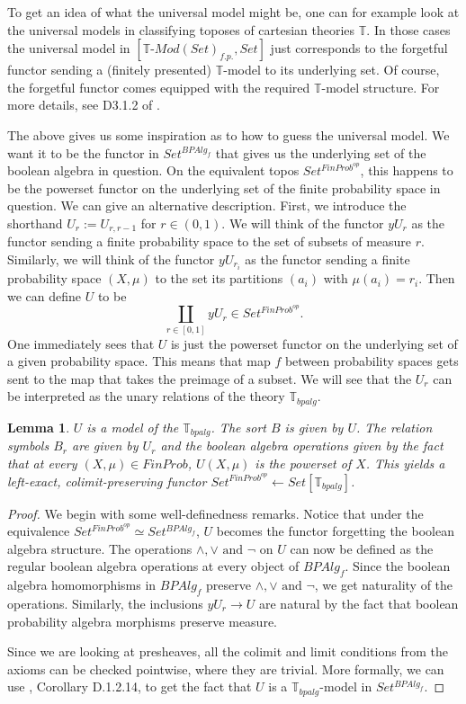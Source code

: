 \documentclass[a4paper]{amsproc}
\theoremstyle{plain}
\newtheorem{lemma}[theorem]{Lemma}
\theoremstyle{definition}
\theoremstyle{remark}
\numberwithin{equation}{section}
\begin{document}
To get an idea of what the universal model might be, one can for example look at the universal models in classifying toposes of cartesian theories $\mathbb{T}$. In those cases the universal model in $[\mathbb{T} \text{-} Mod(Set)_{f.p.}, Set]$ just corresponds to the forgetful functor sending a (finitely presented) $\mathbb{T}$-model to its underlying set. Of course, the forgetful functor comes equipped with the required $\mathbb{T}$-model structure. For more details, see D3.1.2 of \cite{elephant}.

The above gives us some inspiration as to how to guess the universal model. We want it to be the functor in $Set^{BPAlg_f}$ that gives us the underlying set of the boolean algebra in question. On the equivalent topos $Set^{FinProb^{op}}$, this happens to be the powerset functor on the underlying set of the finite probability space in question. We can give an alternative description. First, we introduce the shorthand $U_r := U_{r,r-1}$ for $r \in (0,1)$. We will think of the functor $y U_r$ as the functor sending a finite probability space to the set of subsets of measure $r$. Similarly, we will think of the functor $y U_{r_i}$ as the functor sending a finite probability space $(X,\mu)$ to the set its partitions $(a_i)$ with $\mu(a_i) = r_i$. Then we can define $U$ to be
\[
\coprod_{r \in [0,1]} y U_r \in Set^{FinProb^{op}} .
\]
One immediately sees that $U$ is just the powerset functor on the underlying set of a given probability space. This means that map $f$ between probability spaces gets sent to the map that takes the preimage of a subset. We will see that the $U_r$ can be interpreted as the unary relations of the theory $\mathbb{T}_{bpalg}$.

\begin{lemma} \label{universal model}
$U$ is a model of the $\mathbb{T}_{bpalg}$. The sort $B$ is given by $U$. The relation symbols $B_r$ are given by $U_r$ and the boolean algebra operations given by the fact that at every $(X,\mu) \in FinProb$, $U(X, \mu)$ is the powerset of $X$. This yields a left-exact, colimit-preserving functor $Set^{FinProb^{op}} \leftarrow Set[\mathbb{T}_{bpalg}]$.
\end{lemma}
\begin{proof}
We begin with some well-definedness remarks. Notice that under the equivalence $Set^{FinProb^{op}} \simeq Set^{BPAlg_f}$, $U$ becomes the functor forgetting the boolean algebra structure. The operations $\wedge, \vee \text{ and } \neg$ on $U$ can now be defined as the regular boolean algebra operations at every object of $BPAlg_f$. Since the boolean algebra homomorphisms in $BPAlg_f$ preserve $\wedge, \vee \text{ and } \neg$, we get naturality of the operations. Similarly, the inclusions $y U_r \to U$ are natural by the fact that boolean probability algebra morphisms preserve measure.

Since we are looking at presheaves, all the colimit and limit conditions from the axioms can be checked pointwise, where they are trivial. More formally, we can use \cite{elephant}, Corollary D.1.2.14, to get the fact that $U$ is a $\mathbb{T}_{bpalg}$-model in $Set^{BPAlg_f}$.
\end{proof}
\end{document}

